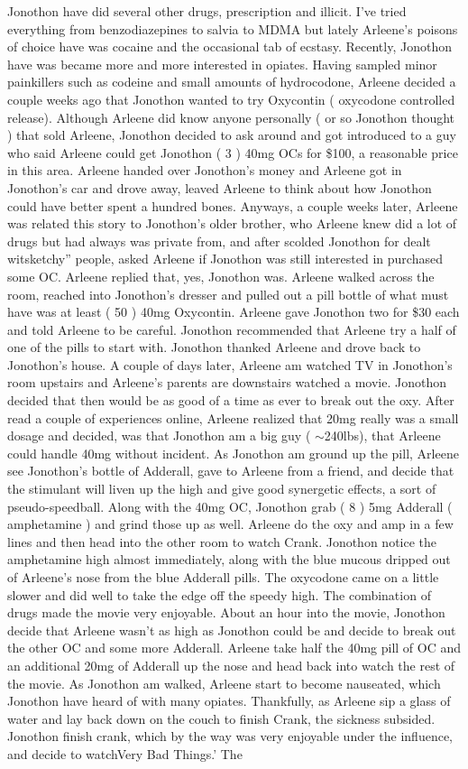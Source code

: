 \documentclass[12pt]{book}
\begin{document}
Jonothon have did several other drugs, prescription and illicit. I've tried everything from benzodiazepines to salvia to MDMA but lately Arleene's poisons of choice have was cocaine and the occasional tab of ecstasy. Recently, Jonothon have was became more and more interested in opiates. Having sampled minor painkillers such as codeine and small amounts of hydrocodone, Arleene decided a couple weeks ago that Jonothon wanted to try Oxycontin ( oxycodone controlled release). Although Arleene did know anyone personally ( or so Jonothon thought ) that sold Arleene, Jonothon decided to ask around and got introduced to a guy who said Arleene could get Jonothon ( 3 ) 40mg OCs for \$100, a reasonable price in this area. Arleene handed over Jonothon's money and Arleene got in Jonothon's car and drove away, leaved Arleene to think about how Jonothon could have better spent a hundred bones. Anyways, a couple weeks later, Arleene was related this story to Jonothon's older brother, who Arleene knew did a lot of drugs but had always was private from, and after scolded Jonothon for dealt witsketchy'' people, asked Arleene if Jonothon was still interested in purchased some OC. Arleene replied that, yes, Jonothon was. Arleene walked across the room, reached into Jonothon's dresser and pulled out a pill bottle of what must have was at least ( 50 ) 40mg Oxycontin. Arleene gave Jonothon two for \$30 each and told Arleene to be careful. Jonothon recommended that Arleene try a half of one of the pills to start with. Jonothon thanked Arleene and drove back to Jonothon's house. A couple of days later, Arleene am watched TV in Jonothon's room upstairs and Arleene's parents are downstairs watched a movie. Jonothon decided that then would be as good of a time as ever to break out the oxy. After read a couple of experiences online, Arleene realized that 20mg really was a small dosage and decided, was that Jonothon am a big guy ( $\sim$240lbs), that Arleene could handle 40mg without incident. As Jonothon am ground up the pill, Arleene see Jonothon's bottle of Adderall, gave to Arleene from a friend, and decide that the stimulant will liven up the high and give good synergetic effects, a sort of pseudo-speedball. Along with the 40mg OC, Jonothon grab ( 8 ) 5mg Adderall ( amphetamine ) and grind those up as well. Arleene do the oxy and amp in a few lines and then head into the other room to watch Crank. Jonothon notice the amphetamine high almost immediately, along with the blue mucous dripped out of Arleene's nose from the blue Adderall pills. The oxycodone came on a little slower and did well to take the edge off the speedy high. The combination of drugs made the movie very enjoyable. About an hour into the movie, Jonothon decide that Arleene wasn't as high as Jonothon could be and decide to break out the other OC and some more Adderall. Arleene take half the 40mg pill of OC and an additional 20mg of Adderall up the nose and head back into watch the rest of the movie. As Jonothon am walked, Arleene start to become nauseated, which Jonothon have heard of with many opiates. Thankfully, as Arleene sip a glass of water and lay back down on the couch to finish Crank, the sickness subsided. Jonothon finish crank, which by the way was very enjoyable under the influence, and decide to watchVery Bad Things.' The 
\end{document}
